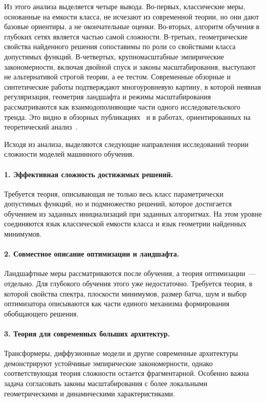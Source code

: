 Из этого анализа выделяется четыре вывода.
Во-первых, классические меры, основанные на емкости класса, не исчезают из современной теории, но  они дают базовые ориентиры, а не окончательные оценки.
Во-вторых, алгоритм обучения в глубоких сетях является частью самой сложности.
В-третьих, геометрические свойства найденного решения сопоставимы по роли со свойствами класса допустимых функций.
В-четвертых, крупномасштабные эмпирические закономерности, включая двойной спуск и законы масштабирования, выступают не альтернативой строгой теории, а ее тестом.
Современные обзорные и синтетические работы подтверждают многоуровневую картину, в которой неявная регуляризация, геометрия ландшафта и режимы масштабирования рассматриваются как взаимодополняющие части одного исследовательского тренда. Это видно в обзорных публикациях~\cite{hu2021complexitysurvey,recent2020theory,belkin2021overview} и в работах, ориентированных на теоретический анализ~\cite{explaining2021thesis,poggio2020theoretical,implicit2026synthesis}.

Исходя из анализа, выделяются следующие направления исследований теории сложности моделей машинного обучения.

\paragraph{1. Эффективная сложность достижимых решений.}
Требуется теория, описывающая не только весь класс параметрически допустимых функций, но и подмножество решений, которое достигается обучением из заданных инициализаций при заданных алгоритмах.
На этом уровне соединяются язык классической емкости класса и язык геометрии найденных минимумов.

\paragraph{2. Совместное описание оптимизации и ландшафта.}
Ландшафтные меры рассматриваются после обучения, а теория оптимизации~--- отдельно.
Для глубокого обучения этого уже недостаточно.
Требуется теория, в которой свойства спектра, плоскости минимумов, размер батча, шум и выбор оптимизатора описываются как части единого механизма формирования обобщающего решения.

\paragraph{3. Теория для современных больших архитектур.}
Трансформеры, диффузионные модели и другие современные архитектуры демонстрируют устойчивые эмпирические закономерности, однако соответствующая теория сложности остается фрагментарной.
Особенно важна задача согласовать законы масштабирования с более локальными геометрическими и динамическими характеристиками.

